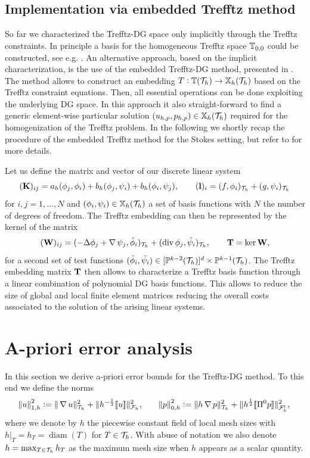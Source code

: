 \documentclass[pdflatex,sn-mathphys,Numbered]{sn-jnl}%
\theoremstyle{remark}%
\theoremstyle{definition}%
\begin{document}
\subsection{Implementation via embedded Trefftz method}\label{sec:impl}
So far we characterized the Trefftz-DG space only implicitly through the Trefftz
constraints. In principle a basis for the homogeneous Trefftz space $\mathbb{T}_{0,0}$ could be
constructed, see e.g. \cite{POITOU2000561,Bouberbachene}. %
An alternative approach, based on the implicit characterization, is the use of the embedded Trefftz-DG method,
presented in \cite{2201.07041}.
The method allows to construct an embedding $T:
\mathbb{T}({\mathcal{T}_h}) \to \mathbb{X}_h({\mathcal{T}_h})$ based on the Trefftz constraint equations. Then, all
essential operations can be done exploiting the underlying DG space. In this
approach it also straight-forward to find a generic element-wise particular
solution $(u_{h,p},p_{h,p})\in \mathbb{X}_h({\mathcal{T}_h})$ required for the homogenization of the
Trefftz problem. In the following we shortly recap the procedure of the embedded Trefftz method for the Stokes
setting, but refer to \cite{2201.07041} for more details. 

Let us define the matrix and vector of our discrete linear system  
\begin{equation*}\label{def:matrices}
    (\mathbf{K})_{ij}=a_h(\phi_j,\phi_i)+b_h(\phi_j,\psi_i)+b_h(\phi_i,\psi_j),
     \qquad 
    (\mathbf{l})_i = (f,\phi_i)_{\mathcal{T}_h} + (g,\psi_i)_{\mathcal{T}_h}
\end{equation*}
for $i,j = 1,\dots, N$ and $(\phi_i,\psi_i)\in \mathbb{X}_h({\mathcal{T}_h})$ a set of basis functions with $N$ the number of degrees of freedom.
The Trefftz embedding can then be represented by the kernel of the matrix
\begin{equation*}
    (\mathbf{W})_{ij}=(-\Delta \phi_j + \operatorname{\nabla}\psi_j, \tilde\phi_i)_{\mathcal{T}_h} + (\operatorname{\mathrm{div}}\phi_j, \tilde\psi_i)_{\mathcal{T}_h},\qquad \mathbf{T}=\ker\mathbf{W},
\end{equation*}
for a second set of test functions $(\tilde\phi_i, \tilde\psi_i)\in
[\mathbb{P}^{k-2}({\mathcal{T}_h})]^d \times \mathbb{P}^{k-1}({\mathcal{T}_h})$. The Trefftz embedding matrix $\mathbf{T}$
then allows to characterize a Trefftz basis function through a linear
combination of polynomial DG basis functions. This allows to reduce the
size of global and local finite element matrices reducing the overall costs
associated to the solution of the arising linear systems.

\section{A-priori error analysis} \label{sec:analysis} In this section
we derive a-priori error bounds for the Trefftz-DG method. To this end
we define the norms
\begin{align*}
  \norm{u}_{1,h}^2 := \Vert \operatorname{\nabla} u \Vert_{{\mathcal{T}_h}}^2 +   \Vert  h^{-\frac12} [\![u]\!] \Vert^2_{{\mathcal{F}_h}}, \qquad 
  \norm{p}_{0,h}^2:= \Vert  h \operatorname{\nabla} p \Vert_{{\mathcal{T}_h}}^2 + \Vert  h^\frac12 [\![\Pi^0 p]\!] \Vert_{{\mathcal{F}_h^{\text{i}}}}^2,
\end{align*}
where we denote by $h$ the piecewise constant field of local mesh
sizes with $h|_T = h_T = \operatorname{diam}(T)$ for $T \in {\mathcal{T}_h}$. With
abuse of notation we also denote $h = \max_{T\in{\mathcal{T}_h}} h_T$ as the
maximum mesh size when $h$ appears as a scalar quantity.
\end{document}
